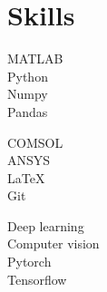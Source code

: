 \documentclass{my_cv}%
\begin{document}
\section{Skills}
\vspace{1em}
\begin{minipage}{0.35\textwidth}
    MATLAB \\           
  Python \\
  Numpy \\ 
  Pandas \\       
\end{minipage}
\begin{minipage}{0.35\textwidth}
   COMSOL \\
   ANSYS \\
   \LaTeX \\
   Git \\
\end{minipage}
\begin{minipage}{0.35\textwidth}
   Deep learning \\
   Computer vision \\
   Pytorch \\
   Tensorflow  \\
\end{minipage}
\end{document}
